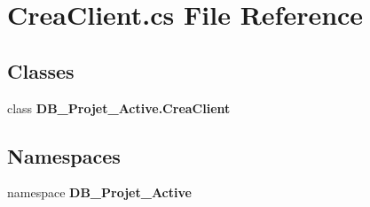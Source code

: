 \section{Crea\+Client.\+cs File Reference}
\label{_crea_client_8cs}
\subsection*{Classes}
\begin{DoxyCompactItemize}
\item 
class \textbf{ D\+B\+\_\+\+Projet\+\_\+\+Active.\+Crea\+Client}
\end{DoxyCompactItemize}
\subsection*{Namespaces}
\begin{DoxyCompactItemize}
\item 
namespace \textbf{ D\+B\+\_\+\+Projet\+\_\+\+Active}
\end{DoxyCompactItemize}
